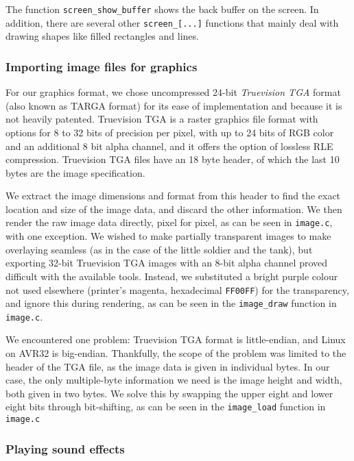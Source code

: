 

The function \texttt{screen\_show\_buffer} shows the back buffer on the
screen. In addition, there are several other \texttt{screen\_[...]}
functions that mainly deal with drawing shapes like filled rectangles
and lines.

\subsubsection{Importing image files for graphics}

For our graphics format, we chose uncompressed 24-bit \emph{Truevision
TGA} format (also known as TARGA format) for its ease of implementation
and because it is not heavily patented. Truevision TGA is a raster
graphics file format with options for 8 to 32 bits of precision per
pixel, with up to 24 bits of RGB color and an additional 8 bit alpha
channel, and it offers the option of lossless RLE compression.
Truevision TGA files have an 18 byte header, of which the last 10 bytes
are the image specification.

We extract the image dimensions and format from this header to find the
exact location and size of the image data, and discard the other
information. We then render the raw image data directly, pixel for
pixel, as can be seen in \texttt{image.c}, with one exception. We wished
to make partially transparent images to make overlaying seamless (as in
the case of the little soldier and the tank), but exporting 32-bit
Truevision TGA images with an 8-bit alpha channel proved difficult with
the available tools. Instead, we substituted a bright purple colour not
used elsewhere (printer's magenta, hexadecimal \texttt{FF00FF}) for the
transparency, and ignore this during rendering, as can be seen in the
\texttt{image\_draw} function in \texttt{image.c}.

We encountered one problem: Truevision TGA format is little-endian, and
Linux on AVR32 is big-endian. Thankfully, the scope of the problem was
limited to the header of the TGA file, as the image data is given in
individual bytes. In our case, the only multiple-byte information we
need is the image height and width, both given in two bytes. We solve
this by swapping the upper eight and lower eight bits through
bit-shifting, as can be seen in the \texttt{image\_load} function in
\texttt{image.c}

\subsubsection{Playing sound effects}

